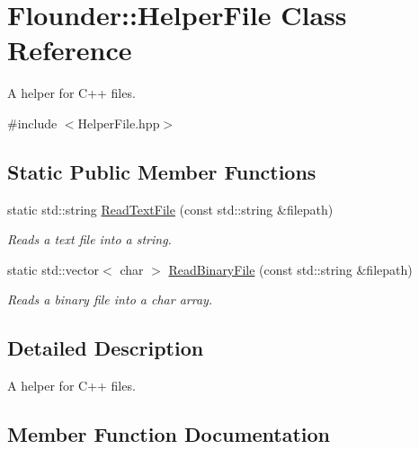 \hypertarget{class_flounder_1_1_helper_file}{}\section{Flounder\+:\+:Helper\+File Class Reference}
\label{class_flounder_1_1_helper_file}


A helper for C++ files.  




{\ttfamily \#include $<$Helper\+File.\+hpp$>$}

\subsection*{Static Public Member Functions}
\begin{DoxyCompactItemize}
\item 
static std\+::string \hyperlink{class_flounder_1_1_helper_file_a81ff850b4da7b08a026ed24a59cbec97}{Read\+Text\+File} (const std\+::string \&filepath)
\begin{DoxyCompactList}\small\item\em Reads a text file into a string. \end{DoxyCompactList}\item 
static std\+::vector$<$ char $>$ \hyperlink{class_flounder_1_1_helper_file_a7f5fc21d12892c6ba00629d813b16e14}{Read\+Binary\+File} (const std\+::string \&filepath)
\begin{DoxyCompactList}\small\item\em Reads a binary file into a char array. \end{DoxyCompactList}\end{DoxyCompactItemize}


\subsection{Detailed Description}
A helper for C++ files. 



\subsection{Member Function Documentation}
\mbox{\label{class_flounder_1_1_helper_file_a7f5fc21d12892c6ba00629d813b16e14}} 

